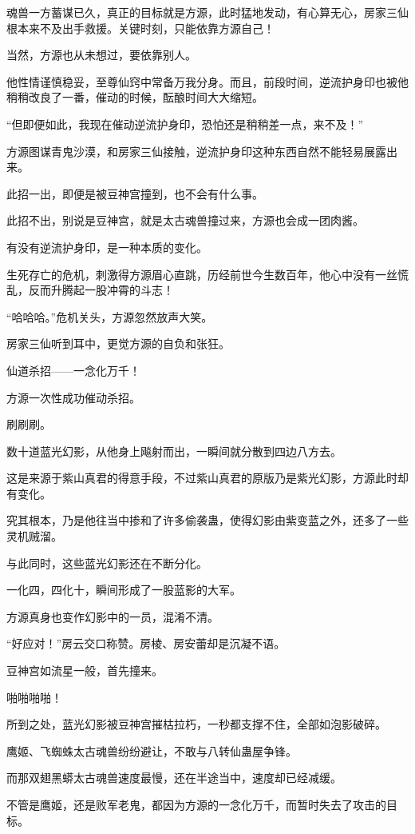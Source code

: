 \begin{this_body}
魂兽一方蓄谋已久，真正的目标就是方源，此时猛地发动，有心算无心，房家三仙根本来不及出手救援。关键时刻，只能依靠方源自己！

当然，方源也从未想过，要依靠别人。

他性情谨慎稳妥，至尊仙窍中常备万我分身。而且，前段时间，逆流护身印也被他稍稍改良了一番，催动的时候，酝酿时间大大缩短。

“但即便如此，我现在催动逆流护身印，恐怕还是稍稍差一点，来不及！”

方源图谋青鬼沙漠，和房家三仙接触，逆流护身印这种东西自然不能轻易展露出来。

此招一出，即便是被豆神宫撞到，也不会有什么事。

此招不出，别说是豆神宫，就是太古魂兽撞过来，方源也会成一团肉酱。

有没有逆流护身印，是一种本质的变化。

生死存亡的危机，刺激得方源眉心直跳，历经前世今生数百年，他心中没有一丝慌乱，反而升腾起一股冲霄的斗志！

“哈哈哈。”危机关头，方源忽然放声大笑。

房家三仙听到耳中，更觉方源的自负和张狂。

仙道杀招——一念化万千！

方源一次性成功催动杀招。

刷刷刷。

数十道蓝光幻影，从他身上飚射而出，一瞬间就分散到四边八方去。

这是来源于紫山真君的得意手段，不过紫山真君的原版乃是紫光幻影，方源此时却有变化。

究其根本，乃是他往当中掺和了许多偷袭蛊，使得幻影由紫变蓝之外，还多了一些灵机贼溜。

与此同时，这些蓝光幻影还在不断分化。

一化四，四化十，瞬间形成了一股蓝影的大军。

方源真身也变作幻影中的一员，混淆不清。

“好应对！”房云交口称赞。房棱、房安蕾却是沉凝不语。

豆神宫如流星一般，首先撞来。

啪啪啪啪！

所到之处，蓝光幻影被豆神宫摧枯拉朽，一秒都支撑不住，全部如泡影破碎。

鹰姬、飞蜘蛛太古魂兽纷纷避让，不敢与八转仙蛊屋争锋。

而那双翅黑蟒太古魂兽速度最慢，还在半途当中，速度却已经减缓。

不管是鹰姬，还是败军老鬼，都因为方源的一念化万千，而暂时失去了攻击的目标。


\end{this_body}
